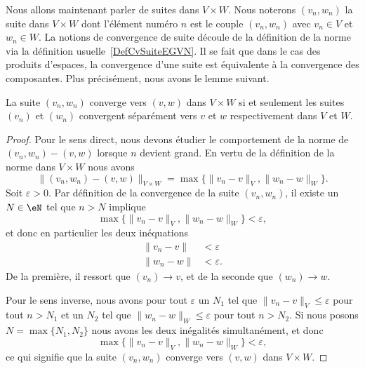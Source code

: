 Nous allons maintenant parler de suites dans $V\times W$. Nous noterons $(v_n,w_n)$ la suite dans $V\times W$ dont l'élément numéro $n$ est le couple $(v_n,w_n)$ avec $v_n\in V$ et $w_n\in W$. La notions de convergence de suite découle de la définition de la norme via la définition usuelle~\ref{DefCvSuiteEGVN}. Il se fait que dans le cas des produits d'espaces, la convergence d'une suite est équivalente à la convergence des composantes. Plus précisément, nous avons le lemme suivant.
\begin{lemma}		\label{LemCvVxWcvVW}
	La suite $(v_n,w_n)$ converge vers $(v,w)$ dans $V\times W$ si et seulement les suites $(v_n)$ et $(w_n)$ convergent séparément vers $v$ et $w$ respectivement dans $V$ et $W$.
\end{lemma}

\begin{proof}
	Pour le sens direct, nous devons étudier le comportement de la norme de $(v_n,w_n)-(v,w)$ lorsque $n$ devient grand. En vertu de la définition de la norme dans $V\times W$ nous avons
	\begin{equation}
		\Big\| (v_n,w_n)-(v,w) \Big\|_{V\times W}=\max\big\{ \| v_n-v \|_V,\| w_n-w \|_W \big\}.
	\end{equation}
	Soit $\varepsilon>0$. Par définition de la convergence de la suite $(v_n,w_n)$, il existe un $N\in\eN$ tel que $n>N$ implique
	\begin{equation}
		\max\big\{ \| v_n-v \|_V,\| w_n-w \|_W \big\}<\varepsilon,
	\end{equation}
	et donc en particulier les deux inéquations
	\begin{subequations}
		\begin{align}
			\| v_n-v \|&<\varepsilon\\
			\| w_n-w \|&<\varepsilon.
		\end{align}
	\end{subequations}
	De la première, il ressort que $(v_n)\to v$, et de la seconde que $(w_n)\to w$.

	Pour le sens inverse, nous avons pour tout $\varepsilon$ un $N_1$ tel que $\| v_n-v \|_V\leq\varepsilon$ pour tout $n>N_1$ et un $N_2$ tel que $\| w_n-w \|_W\leq\varepsilon$ pour tout $n>N_2$. Si nous posons $N=\max\{ N_1,N_2 \}$ nous avons les deux inégalités simultanément, et donc
	\begin{equation}
		\max\big\{ \| v_n-v \|_V,\| w_n-w \|_W \big\}<\varepsilon,
	\end{equation}
	ce qui signifie que la suite $(v_n,w_n)$ converge vers $(v,w)$ dans $V\times W$.
\end{proof}

